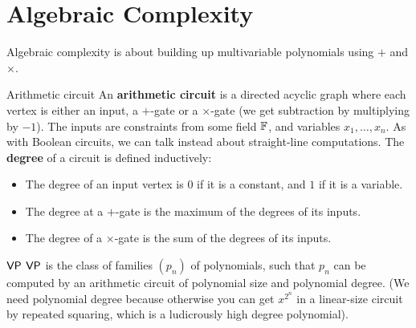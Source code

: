 \documentclass{article}
\begin{document}
\section{Algebraic Complexity}
Algebraic complexity is about building up multivariable polynomials using $+$ and $\times$. \begin{fancydefine}{Arithmetic circuit}
    An \textbf{arithmetic circuit} is a directed acyclic graph where each vertex is either an input, a $+$-gate or a $\times$-gate (we get subtraction by multiplying by $-1$). The inputs are constraints from some field $\mathbb{F}$, and variables $x_{1},\dots,x_{n}$. As with Boolean circuits, we can talk instead about straight-line computations. \gap 
    The \textbf{degree} of a circuit is defined inductively: \begin{itemize}
        \item The degree of an input vertex is $0$ if it is a constant, and $1$ if it is a variable.
        \item The degree at a $+$-gate is the maximum of the degrees of its inputs.
        \item The degree of a $\times$-gate is the sum of the degrees of its inputs.
    \end{itemize}
\end{fancydefine}
\begin{fancydefine}{$\mathsf{VP}$}
    $\mathsf{VP}$ is the class of families $(p_{n})$ of polynomials, such that $p_{n}$ can be computed by an arithmetic circuit of polynomial size and polynomial degree. (We need polynomial degree because otherwise you can get $x^{2^{n}}$ in a linear-size circuit by repeated squaring, which is a ludicrously high degree polynomial).
\end{fancydefine}
\end{document}
